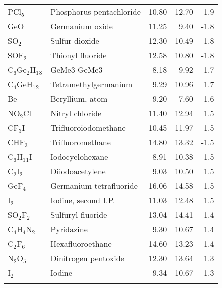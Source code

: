 \begin{table}
\begin{center}
\begin{tabular}{llrrr}
 PCl$_5$              & Phosphorus pentachloride               &   10.80   &    12.70   &    1.9\\
 GeO                  & Germanium oxide                        &   11.25   &     9.40   &   -1.8\\
 SO$_2$               & Sulfur dioxide                         &   12.30   &    10.49   &   -1.8\\
 SOF$_2$              & Thionyl fluoride                       &   12.58   &    10.80   &   -1.8\\
 C$_6$Ge$_2$H$_1$$_8$ & GeMe3-GeMe3                            &    8.18   &     9.92   &    1.7\\
 C$_4$GeH$_1$$_2$     & Tetramethylgermanium                   &    9.29   &    10.96   &    1.7\\
 Be                   & Beryllium, atom                        &    9.20   &     7.60   &   -1.6\\
 NO$_2$Cl             & Nitryl chloride                        &   11.40   &    12.94   &    1.5\\
 CF$_3$I              & Trifluoroiodomethane                   &   10.45   &    11.97   &    1.5\\
 CHF$_3$              & Trifluoromethane                       &   14.80   &    13.32   &   -1.5\\
 C$_6$H$_1$$_1$I      & Iodocyclohexane                        &    8.91   &    10.38   &    1.5\\
 C$_2$I$_2$           & Diiodoacetylene                        &    9.03   &    10.50   &    1.5\\
 GeF$_4$              & Germanium tetrafluoride                &   16.06   &    14.58   &   -1.5\\
 I$_2$                & Iodine, second I.P.                    &   11.03   &    12.48   &    1.5\\
 SO$_2$F$_2$          & Sulfuryl fluoride                      &   13.04   &    14.41   &    1.4\\
 C$_4$H$_4$N$_2$      & Pyridazine                             &    9.30   &    10.67   &    1.4\\
 C$_2$F$_6$           & Hexafluoroethane                       &   14.60   &    13.23   &   -1.4\\
 N$_2$O$_5$           & Dinitrogen pentoxide                   &   12.30   &    13.64   &    1.3\\
 I$_2$                & Iodine                                 &    9.34   &    10.67   &    1.3\\
$$
\end{tabular}
\end{center}
\end{table}

